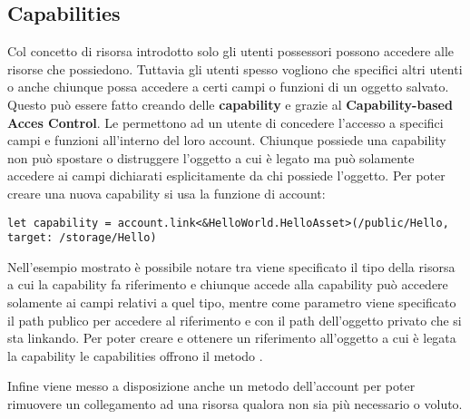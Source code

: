 \subsection{Capabilities}
Col concetto di risorsa introdotto solo gli utenti possessori possono accedere alle risorse che possiedono. Tuttavia gli utenti spesso vogliono che specifici altri utenti o anche chiunque possa accedere a certi campi o funzioni di un oggetto salvato. Questo può essere fatto creando delle \textbf{capability} e grazie al \textbf{Capability-based Acces Control}. Le  permettono ad un utente di concedere l'accesso a specifici campi e funzioni all'interno del loro account. Chiunque possiede una capability non può spostare o distruggere l'oggetto a cui è legato ma può solamente accedere ai campi dichiarati esplicitamente da chi possiede l'oggetto. Per poter creare una nuova capability si usa la funzione  di account:
\begin{lstlisting}[style=all, style=cadence]
let capability = account.link<&HelloWorld.HelloAsset>(/public/Hello,    target: /storage/Hello)
\end{lstlisting}
Nell'esempio mostrato è possibile notare tra \codeinline{<>} viene specificato il tipo della risorsa a cui la capability fa riferimento e chiunque accede alla capability può accedere solamente ai campi relativi a quel tipo, mentre come parametro viene specificato il path publico per accedere al riferimento e con  il path dell'oggetto privato che si sta linkando.
Per poter creare e ottenere un riferimento all'oggetto a cui è legata la capability le capabilities offrono il metodo . 

Infine viene messo a disposizione anche un metodo  dell'account per poter rimuovere un collegamento ad una risorsa qualora non sia più necessario o voluto.